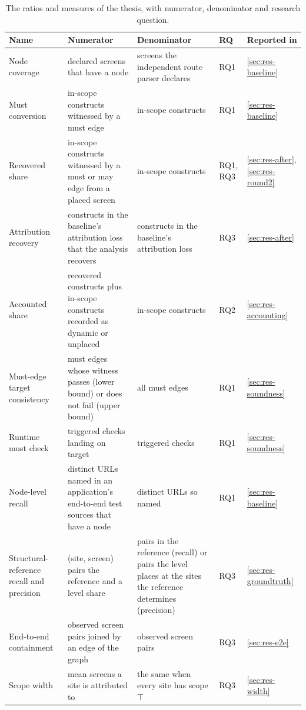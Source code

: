 \begin{table}[tp]\footnotesize
\caption{The ratios and measures of the thesis, with numerator, denominator and research question.}
\label{tab:ratios}
\begin{tabularx}{\textwidth}{@{}>{\raggedright\arraybackslash}p{2.4cm}YY>{\raggedright\arraybackslash}p{0.9cm}>{\raggedright\arraybackslash}p{2.0cm}@{}}
\toprule
Name & Numerator & Denominator & RQ & Reported in \\
\midrule
Node coverage & declared screens that have a node & screens the independent route parser declares & RQ1 & \ref{sec:res-baseline} \\
Must conversion & in-scope constructs witnessed by a must edge & in-scope constructs & RQ1 & \ref{sec:res-baseline} \\
Recovered share & in-scope constructs witnessed by a must or may edge from a placed screen & in-scope constructs & RQ1, RQ3 & \ref{sec:res-after}, \ref{sec:res-round2} \\
Attribution recovery & constructs in the baseline's attribution loss that the analysis recovers & constructs in the baseline's attribution loss & RQ3 & \ref{sec:res-after} \\
Accounted share & recovered constructs plus in-scope constructs recorded as dynamic or unplaced & in-scope constructs & RQ2 & \ref{sec:res-accounting} \\
Must-edge target consistency & must edges whose witness passes (lower bound) or does not fail (upper bound) & all must edges & RQ1 & \ref{sec:res-soundness} \\
Runtime must check & triggered checks landing on target & triggered checks & RQ1 & \ref{sec:res-soundness} \\
Node-level recall & distinct URLs named in an application's end-to-end test sources that have a node & distinct URLs so named & RQ1 & \ref{sec:res-baseline} \\
Structural-reference recall and precision & (site, screen) pairs the reference and a level share & pairs in the reference (recall) or pairs the level places at the sites the reference determines (precision) & RQ3 & \ref{sec:res-groundtruth} \\
End-to-end containment & observed screen pairs joined by an edge of the graph & observed screen pairs & RQ3 & \ref{sec:res-e2e} \\
Scope width & mean screens a site is attributed to & the same when every site has scope $\top$ & RQ3 & \ref{sec:res-width} \\

\end{tabularx}
\end{table}
